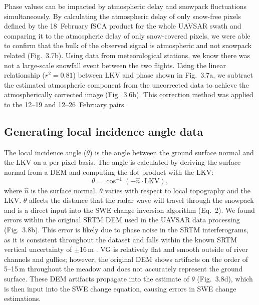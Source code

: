 Phase values can be impacted by atmospheric delay and snowpack fluctuations simultaneously. By calculating the atmospheric delay of only snow-free pixels defined by the 18~February fSCA product for the whole UAVSAR swath and comparing it to the atmospheric delay of only snow-covered pixels, we were able to confirm that the bulk of the observed signal is atmospheric and not snowpack related (Fig.~3.7b). Using data from meteorological stations, we know there was not a large-scale snowfall event between the two flights. Using the linear relationship ($r^{2} = 0.81$) between LKV and phase shown in Fig.~3.7a, we subtract the estimated atmospheric component from the uncorrected data to achieve the atmospherically corrected image (Fig.~3.6b). This correction method was applied to the 12--19  and 12--26~February pairs.

\hypertarget{ch3-methods-11}{\subsection{Generating local incidence angle data}\label{ch3-methods-11}}


The local incidence angle ($\theta$) is the angle between the ground surface normal and the LKV on a per-pixel basis. The angle is calculated by deriving the surface normal from a DEM and computing the dot product with the LKV:
\begin{equation}
\theta = \cos^{-1}(-\hat{n}\cdot \text{LKV}),
\end{equation}
where $\hat{n}$ is the surface normal. $\theta$ varies with respect to local topography and the LKV. $\theta$ affects the distance that the radar wave will travel through the snowpack and is a direct input into the SWE change inversion algorithm (Eq.~2). We found errors within the original SRTM DEM used in the UAVSAR data processing (Fig.~3.8b). This error is likely due to phase noise in the SRTM interferograms, as it is consistent throughout the dataset and falls within the known SRTM vertical uncertainty of $\pm$16\,m \citep{rodriguezGlobalAssessmentSRTM2006,sunValidationSurfaceHeight2003}. VG is relatively flat and smooth outside of river channels and gullies; however, the original DEM shows artifacts on the order of 5--15\,m throughout the meadow and does not accurately represent the ground surface. These DEM artifacts propagate into the estimate of $\theta$ (Fig.~3.8d), which is then input into the SWE change equation, causing errors in SWE change estimations.

